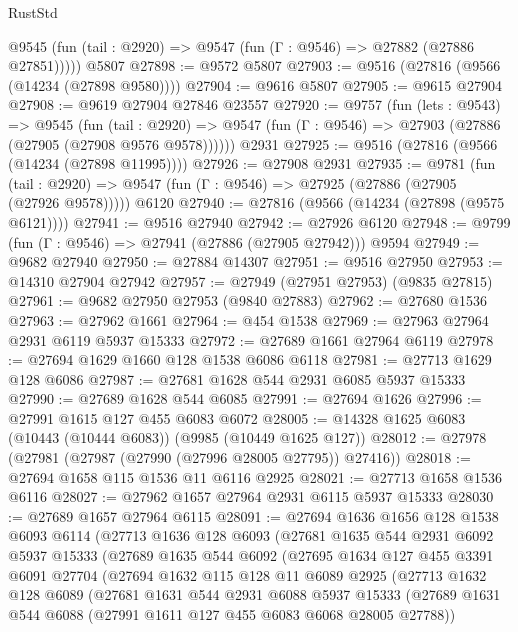 \begin{lexlean}{RustStd}
\begin{coremodule}
      @9545 (fun (tail : @2920) => @9547 (fun (Γ : @9546) => @27882 (@27886 @27851)))))
    @5807
@27898 := @9572 @5807
@27903 := @9516 (@27816 (@9566 (@14234 (@27898 @9580))))
@27904 := @9616 @5807
@27905 := @9615 @27904
@27908 := @9619 @27904 @27846 @23557
@27920 := @9757
    (fun (lets : @9543) =>
    @9545
      (fun (tail : @2920) =>
      @9547 (fun (Γ : @9546) => @27903 (@27886 (@27905 (@27908 @9576 @9578))))))
    @2931
@27925 := @9516 (@27816 (@9566 (@14234 (@27898 @11995))))
@27926 := @27908 @2931
@27935 := @9781
    (fun (tail : @2920) => @9547 (fun (Γ : @9546) => @27925 (@27886 (@27905 (@27926 @9578)))))
    @6120
@27940 := @27816 (@9566 (@14234 (@27898 (@9575 @6121))))
@27941 := @9516 @27940
@27942 := @27926 @6120
@27948 := @9799 (fun (Γ : @9546) => @27941 (@27886 (@27905 @27942))) @9594
@27949 := @9682 @27940
@27950 := @27884 @14307
@27951 := @9516 @27950
@27953 := @14310 @27904 @27942
@27957 := @27949 (@27951 @27953) (@9835 @27815)
@27961 := @9682 @27950 @27953 (@9840 @27883)
@27962 := @27680 @1536
@27963 := @27962 @1661
@27964 := @454 @1538
@27969 := @27963 @27964 @2931 @6119 @5937 @15333
@27972 := @27689 @1661 @27964 @6119
@27978 := @27694 @1629 @1660 @128 @1538 @6086 @6118
@27981 := @27713 @1629 @128 @6086
@27987 := @27681 @1628 @544 @2931 @6085 @5937 @15333
@27990 := @27689 @1628 @544 @6085
@27991 := @27694 @1626
@27996 := @27991 @1615 @127 @455 @6083 @6072
@28005 := @14328 @1625 @6083 (@10443 (@10444 @6083)) (@9985 (@10449 @1625 @127))
@28012 := @27978 (@27981 (@27987 (@27990 (@27996 @28005 @27795)) @27416))
@28018 := @27694 @1658 @115 @1536 @11 @6116 @2925
@28021 := @27713 @1658 @1536 @6116
@28027 := @27962 @1657 @27964 @2931 @6115 @5937 @15333
@28030 := @27689 @1657 @27964 @6115
@28091 := @27694
    @1636
    @1656
    @128
    @1538
    @6093
    @6114
    (@27713
      @1636
      @128
      @6093
      (@27681
        @1635
        @544
        @2931
        @6092
        @5937
        @15333
        (@27689
          @1635
          @544
          @6092
          (@27695
            @1634
            @127
            @455
            @3391
            @6091
            @27704
            (@27694
              @1632
              @115
              @128
              @11
              @6089
              @2925
              (@27713
                @1632
                @128
                @6089
                (@27681
                  @1631
                  @544
                  @2931
                  @6088
                  @5937
                  @15333
                  (@27689 @1631 @544 @6088 (@27991 @1611 @127 @455 @6083 @6068 @28005 @27788))

\end{coremodule}
\end{lexlean}
